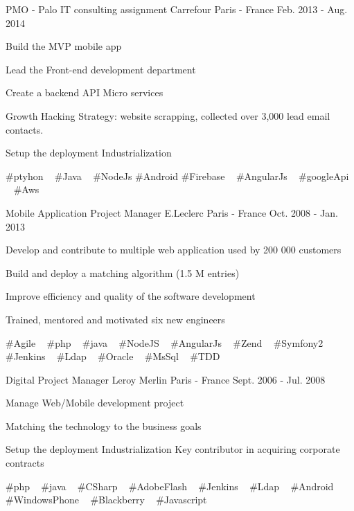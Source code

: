 \begin{cventries}
  \cventry
    {PMO - Palo IT consulting assignment} %
    {Carrefour} %
    {Paris - France} %
    {Feb. 2013 - Aug. 2014} %
    {
      \begin{cvitems} %
        \item {Build the MVP mobile app}
        \item {Lead the Front-end development department}
        \item {Create a backend API Micro services}
        \item {Growth Hacking Strategy: website scrapping, collected over 3,000 lead email contacts.}
        \item {Setup the deployment Industrialization}
      \end{cvitems}
    }
    {
      \#ptyhon ~
      \#Java ~
      \#NodeJs
      \#Android
      \#Firebase ~
      \#AngularJs ~
      \#googleApi ~
      \#Aws ~
    }

  \cventry
    {Mobile Application Project Manager} %
    {E.Leclerc} %
    {Paris - France} %
    {Oct. 2008 - Jan. 2013} %
    {
      \begin{cvitems} %
        \item {Develop and contribute to multiple web application used by 200 000 customers}
        \item {Build and deploy a matching algorithm (1.5 M entries)}
        \item {Improve efficiency and quality of the software development}
        \item {Trained, mentored and motivated six new engineers}
      \end{cvitems}
    }
    {
      \#Agile ~
      \#php ~
      \#java ~
      \#NodeJS ~
      \#AngularJs ~
      \#Zend ~
      \#Symfony2 ~
      \#Jenkins ~
      \#Ldap ~
      \#Oracle ~
      \#MsSql ~
      \#TDD
    }

  \cventry
    {Digital Project Manager} %
    {Leroy Merlin} %
    {Paris - France} %
    {Sept. 2006 - Jul. 2008} %
    {
      \begin{cvitems} %
        \item {Manage Web/Mobile development project}
        \item {Matching the technology to the business goals}
        \item {Setup the deployment Industrialization Key contributor in acquiring corporate contracts}
      \end{cvitems}
    }
    {
      \#php ~
      \#java ~
      \#CSharp ~
      \#AdobeFlash ~
      \#Jenkins ~
      \#Ldap ~
      \#Android ~
      \#WindowsPhone ~
      \#Blackberry ~
      \#Javascript
    }

\end{cventries}
